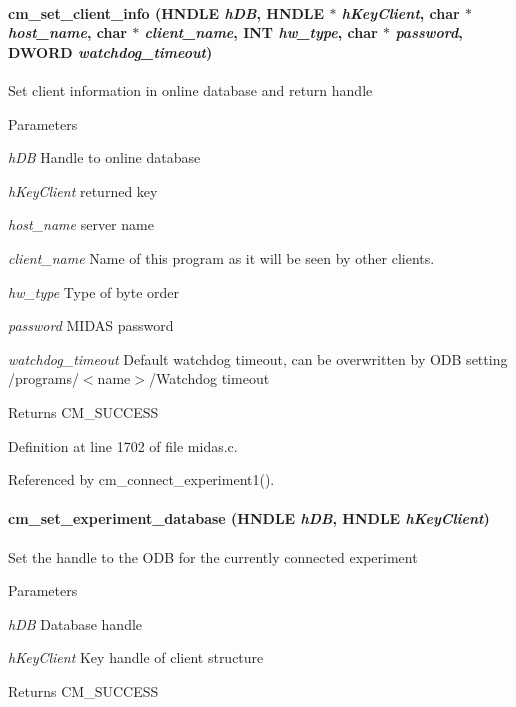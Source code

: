 \paragraph[{cm\_\-set\_\-client\_\-info}]{ cm\_\-set\_\-client\_\-info (HNDLE {\em hDB}, \/  HNDLE $\ast$ {\em hKeyClient}, \/  char $\ast$ {\em host\_\-name}, \/  char $\ast$ {\em client\_\-name}, \/  {\bf INT} {\em hw\_\-type}, \/  char $\ast$ {\em password}, \/  {\bf DWORD} {\em watchdog\_\-timeout})}\hfill\label{group__cmfunctionc_gae50ca92a705efaed76dd1204a3caa32e}
Set client information in online database and return handle 
\begin{DoxyParams}{Parameters}
\item[{\em hDB}]Handle to online database \item[{\em hKeyClient}]returned key \item[{\em host\_\-name}]server name \item[{\em client\_\-name}]Name of this program as it will be seen by other clients. \item[{\em hw\_\-type}]Type of byte order \item[{\em password}]MIDAS password \item[{\em watchdog\_\-timeout}]Default watchdog timeout, can be overwritten by ODB setting /programs/$<$name$>$/Watchdog timeout \end{DoxyParams}
\begin{DoxyReturn}{Returns}
CM\_\-SUCCESS 
\end{DoxyReturn}


Definition at line 1702 of file midas.c.

Referenced by cm\_\-connect\_\-experiment1().
\paragraph[{cm\_\-set\_\-experiment\_\-database}]{ cm\_\-set\_\-experiment\_\-database (HNDLE {\em hDB}, \/  HNDLE {\em hKeyClient})}\hfill\label{group__cmfunctionc_gadf088255bf3e91f3efe83c7e5f0cd733}
Set the handle to the ODB for the currently connected experiment 
\begin{DoxyParams}{Parameters}
\item[{\em hDB}]Database handle \item[{\em hKeyClient}]Key handle of client structure \end{DoxyParams}
\begin{DoxyReturn}{Returns}
CM\_\-SUCCESS 
\end{DoxyReturn}


